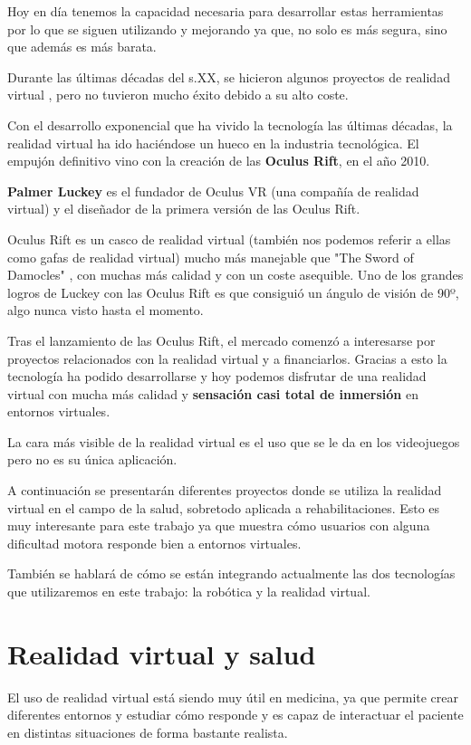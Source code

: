 \documentclass[twoside, 12pt]{epstfg}
\begin{document}
Hoy en día tenemos la capacidad necesaria para desarrollar estas herramientas por lo que se siguen utilizando y mejorando ya que, no solo es más segura, sino que además es más barata.

Durante las últimas décadas del s.XX, se hicieron algunos proyectos de realidad virtual , pero no tuvieron mucho éxito debido a su alto coste.

Con el desarrollo exponencial que ha vivido la tecnología las últimas décadas, la realidad virtual ha ido haciéndose un hueco en la industria tecnológica.
El empujón definitivo vino con la creación de las \textbf{Oculus Rift}, en el año 2010.

\textbf{Palmer Luckey} es el fundador de Oculus VR (una compañía de realidad virtual) y el diseñador de la primera versión de las Oculus Rift.

Oculus Rift es un casco de realidad virtual (también nos podemos referir a ellas como gafas de realidad virtual) mucho más manejable que "The Sword of Damocles" , con muchas más calidad y con un coste asequible.
Uno de los grandes logros de Luckey con las Oculus Rift es que consiguió un ángulo de visión de 90º, algo nunca visto hasta el momento.

Tras el lanzamiento de las Oculus Rift, el mercado comenzó a interesarse por proyectos relacionados con la realidad virtual y a financiarlos.
Gracias a esto la tecnología ha podido desarrollarse y hoy podemos disfrutar de una realidad virtual con mucha más calidad y \textbf{sensación casi total de inmersión} en entornos virtuales.

La cara más visible de la realidad virtual es el uso que se le da en los videojuegos pero no es su única aplicación.

A continuación se presentarán diferentes proyectos donde se utiliza la realidad virtual en el campo de la salud, sobretodo aplicada a rehabilitaciones. Esto es muy interesante para este trabajo ya que muestra cómo usuarios con alguna dificultad motora responde bien a entornos virtuales.

También se hablará de cómo se están integrando actualmente  las dos tecnologías que utilizaremos en este trabajo: la robótica y la realidad virtual.


\section{Realidad virtual y salud}
\label{sec:VR y salud}

El uso de realidad virtual está siendo muy útil en medicina, ya que permite crear diferentes entornos y estudiar cómo responde y  es capaz de interactuar el paciente en distintas situaciones de forma bastante realista.
\end{document}
